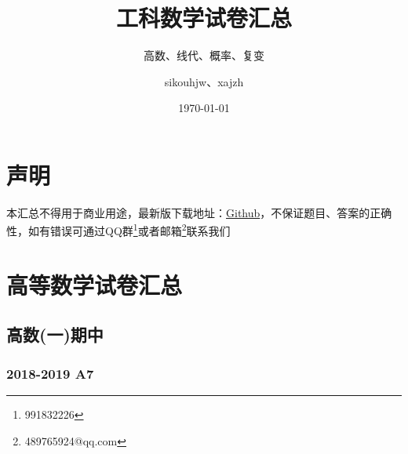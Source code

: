 \documentclass[cn,11pt,fancy,hide]{elegantbook}
\title{工科数学试卷汇总}
\subtitle{高数、线代、概率、复变}
\author{sikouhjw、xajzh}
\institute{临时组织起来的重排小组}
\date{\today}
\begin{document}
\maketitle
\tableofcontents


\mainmatter
\hypersetup{pageanchor=true}
\chapter{声明}
本汇总不得用于商业用途，最新版下载地址：\href{https://github.com/sikouhjw/LaTeX-learning-notes/tree/master/%E9%AB%98%E6%95%B0+%E7%BA%BF%E4%BB%A3+%E6%A6%82%E7%8E%87%E9%87%8D%E6%8E%92}{Github}，不保证题目、答案的正确性，如有错误可通过QQ群\footnote{991832226}或者邮箱\footnote{489765924@qq.com}联系我们

\chapter{高等数学试卷汇总}

\section{高数(一)期中}

\subsection{2018-2019 A7}
\end{document}
